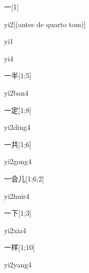 \begin{verbete}[yi2]{一}[1]
\begin{pronuncia}[\\]{yi2}[(antes de quarto tom)]
\end{pronuncia}
\begin{pronuncia}{yi1}
\end{pronuncia}
\begin{pronuncia}{yi4}
\end{pronuncia}
\end{verbete}

\begin{verbete}[yi2ban4]{一半}[1;5]
\begin{pronuncia}{yi2ban4}
\end{pronuncia}
\end{verbete}

\begin{verbete}[yi2ding4]{一定}[1;8]
\begin{pronuncia}{yi2ding4}
\end{pronuncia}
\end{verbete}

\begin{verbete}[yi2gong4]{一共}[1;6]
\begin{pronuncia}{yi2gong4}
\end{pronuncia}
\end{verbete}

\begin{verbete}[yi2huir4]{一会儿}[1;6;2]
\begin{pronuncia}{yi2huir4}
\end{pronuncia}
\end{verbete}

\begin{verbete}[yi2xia4]{一下}[1;3]
\begin{pronuncia}{yi2xia4}
\end{pronuncia}
\end{verbete}

\begin{verbete}[yi2yang4]{一样}[1;10]
\begin{pronuncia}{yi2yang4}
\end{pronuncia}
\end{verbete}

